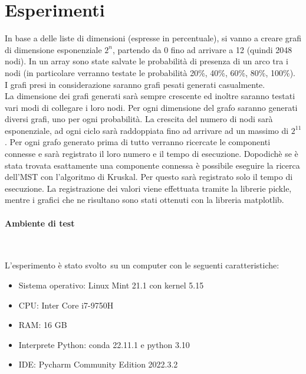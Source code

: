 \documentclass[
]{article}
\begin{document}
\hypertarget{esperimenti}{%
\section{Esperimenti}\label{esperimenti}}

In base a delle liste di dimensioni (espresse in percentuale), si vanno
a creare grafi di dimensione esponenziale \(2^n\), partendo da 0 fino ad
arrivare a 12 (quindi 2048 nodi). In un array sono state salvate le
probabilità di presenza di un arco tra i nodi (in particolare verranno
testate le probabilità 20\%, 40\%, 60\%, 80\%, 100\%).\\
I grafi presi in considerazione saranno grafi pesati generati
casualmente.\\
La dimensione dei grafi generati sarà sempre crescente ed inoltre
saranno testati vari modi di collegare i loro nodi. Per ogni dimensione
del grafo saranno generati diversi grafi, uno per ogni probabilità. La
crescita del numero di nodi sarà esponenziale, ad ogni ciclo sarà
raddoppiata fino ad arrivare ad un massimo di $2^{11}$. Per ogni
grafo generato prima di tutto verranno ricercate le componenti connesse
e sarà registrato il loro numero e il tempo di esecuzione. Dopodichè se
è stata trovata esattamente una componente connessa è possibile eseguire
la ricerca dell'MST con l'algoritmo di Kruskal. Per questo sarà
registrato solo il tempo di esecuzione. La registrazione dei valori
viene effettuata tramite la librerie pickle, mentre i grafici che ne
risultano sono stati ottenuti con la libreria matplotlib.

\hypertarget{ambiente-di-test}{%
\paragraph{Ambiente di test}\label{ambiente-di-test}}

\

L'esperimento è stato svolto~su un computer con le seguenti caratteristiche:

\begin{itemize}
\item
  Sistema operativo: Linux Mint 21.1 con kernel 5.15
\item
  CPU: Inter Core i7-9750H
\item
  RAM: 16 GB
\item
  Interprete Python: conda 22.11.1 e python 3.10
\item
  IDE: Pycharm Community Edition 2022.3.2
\end{itemize}
\end{document}
